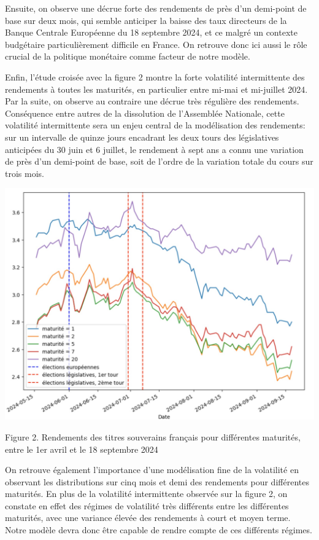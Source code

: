 \documentclass[a4paper]{article}
\begin{document}
Ensuite, on observe une décrue forte des rendements de près d’un demi-point de base sur deux mois, qui semble anticiper la baisse des taux directeurs de la Banque Centrale Européenne du 18 septembre 2024, et ce malgré un contexte budgétaire particulièrement difficile en France. On retrouve donc ici aussi le rôle crucial de la politique monétaire comme facteur de notre modèle.

Enfin, l’étude croisée avec la figure 2 montre la forte volatilité intermittente des rendements à toutes les maturités, en particulier entre mi-mai et mi-juillet 2024. Par la suite, on observe au contraire une décrue très régulière des rendements. Conséquence entre autres de la dissolution de l’Assemblée Nationale, cette volatilité intermittente sera un enjeu central de la modélisation des rendements: sur un intervalle de quinze jours encadrant les deux tours des législatives anticipées du 30 juin et 6 juillet, le rendement à sept ans a connu une variation de près d’un demi-point de base, soit de l’ordre de la variation totale du cours sur trois mois.
\newpage
\begin{center}

\includegraphics[scale=0.25]{election.jpg}

Figure 2. Rendements des titres souverains français pour différentes maturités, entre le 1er avril et le 18 septembre 2024

\end{center}



On retrouve également l’importance d’une modélisation fine de la volatilité en observant les distributions sur cinq mois et demi des rendements pour différentes maturités. En plus de la volatilité intermittente observée sur la figure 2, on constate en effet des régimes de volatilité très différents entre les différentes maturités, avec une variance élevée des rendements à court et moyen terme. Notre modèle devra donc être capable de rendre compte de ces différents régimes.
\end{document}
